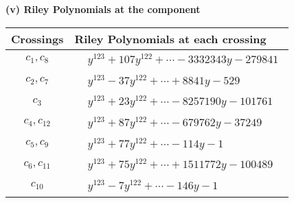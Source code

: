 \documentclass[1p]{elsarticle_modified}
\theoremstyle{definition}
\begin{document}
\flushleft \textbf{(v) Riley Polynomials at the component}\newline \\
\begin{tabular}{m{50pt}|m{274pt}}
Crossings & \hspace{64pt}Riley Polynomials at each crossing \\
\hline $$\begin{aligned}c_{1},c_{8}\end{aligned}$$&$\begin{aligned}
&y^{123}+107 y^{122}+\cdots-3332343 y-279841
\end{aligned}$\\
\hline $$\begin{aligned}c_{2},c_{7}\end{aligned}$$&$\begin{aligned}
&y^{123}-37 y^{122}+\cdots+8841 y-529
\end{aligned}$\\
\hline $$\begin{aligned}c_{3}\end{aligned}$$&$\begin{aligned}
&y^{123}+23 y^{122}+\cdots-8257190 y-101761
\end{aligned}$\\
\hline $$\begin{aligned}c_{4},c_{12}\end{aligned}$$&$\begin{aligned}
&y^{123}+87 y^{122}+\cdots-679762 y-37249
\end{aligned}$\\
\hline $$\begin{aligned}c_{5},c_{9}\end{aligned}$$&$\begin{aligned}
&y^{123}+77 y^{122}+\cdots-114 y-1
\end{aligned}$\\
\hline $$\begin{aligned}c_{6},c_{11}\end{aligned}$$&$\begin{aligned}
&y^{123}+75 y^{122}+\cdots+1511772 y-100489
\end{aligned}$\\
\hline $$\begin{aligned}c_{10}\end{aligned}$$&$\begin{aligned}
&y^{123}-7 y^{122}+\cdots-146 y-1
\end{aligned}$\\
\hline
\end{tabular}\\~\\
\end{document}
